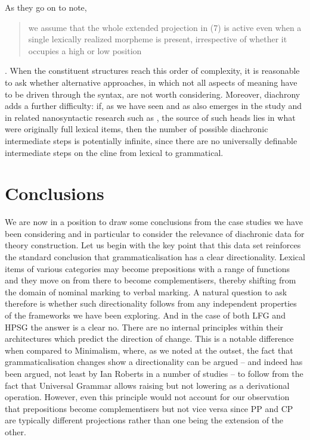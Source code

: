 \documentclass[output=paper]{langsci/langscibook}
\begin{document}
As they go on to note, \blockquote{we assume that the whole extended projection
in (7) is active even when a single lexically realized morpheme is present,
irrespective of whether it occupies a high or low position}
\citeyearpar[292]{MunaPole14}. When the constituent structures reach this order
of complexity, it is reasonable to ask whether alternative approaches, in which
not all aspects of meaning have to be driven through the syntax, are not worth
considering. Moreover, diachrony adds a further difficulty: if, as we have seen
and as also emerges in the \citeauthor{MunaPole14} study and in related
nanosyntactic research such as \cite{RoySven09}, the source of such heads lies
in what were originally full lexical items, then the number of possible
diachronic intermediate steps is potentially infinite, since there are no
universally definable intermediate steps on the cline from lexical to
grammatical.

\section{Conclusions}

We are now in a position to draw some conclusions from the case studies we have
been considering and in particular to consider the relevance of diachronic data
for theory construction. Let us begin with the key point that this data set
reinforces the standard conclusion that grammaticalisation has a clear
directionality. Lexical items of various categories may become prepositions
with a range of functions and they move on from there to become
complementisers, thereby shifting from the domain of nominal marking to verbal
marking. A natural question to ask therefore is whether such directionality
follows from any independent properties of the frameworks we have been
exploring. And in the case of both \gls{LFG}
and \gls{HPSG} the answer is a clear
no. There are no  internal principles within their architectures which predict
the direction of change. This is a notable difference when compared to
Minimalism, where, as we noted at the outset, the fact that
grammaticalisation changes show a directionality  can be
argued -- and indeed has been argued, not least by Ian Roberts in a number of
studies -- to follow from the fact that Universal Grammar allows raising but
not lowering as a derivational operation. However, even this principle would
not account for our observation that prepositions become
complementisers but not vice versa since PP and CP are
typically different projections rather than one being the extension of the
other.
\end{document}
